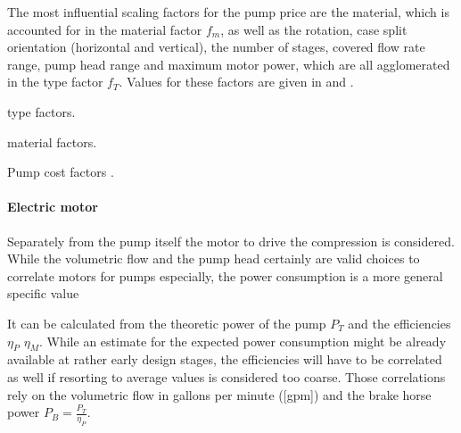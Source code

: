 			The most influential scaling factors for the pump price are the material, which is accounted
			for in the material factor $f_m$, as well as the rotation, case split orientation (horizontal
			and vertical), the number of stages, covered flow rate range, pump head range and maximum
			motor power, which are all agglomerated in the type factor $f_T$. Values for these factors
			are given in  and .
			
            \begin{table}
                \center
                \begin{subtable}{.68\linewidth}
                    \footnotesize
                    \center
                    
                    \caption{type factors.}
                    \label{tab:pump:Type}
                \end{subtable}
                \begin{subtable}{.3\linewidth}
                    \footnotesize
                    \center
                    
                    \caption{material factors.}
                    \label{tab:pump:Material}
                \end{subtable}
                \caption{Pump cost factors \cite{Seider.2010}.}
            \end{table}
			
		\paragraph{Electric motor}
			Separately from the pump itself the motor to drive the compression is considered. While the
			volumetric flow and the pump head certainly are valid choices to correlate motors for pumps
			especially, the power consumption is a more general specific value
			
			It can be calculated from the theoretic power of the pump $P_T$ and the efficiencies $\eta_P$
			$\eta_M$. While an estimate for the expected power consumption might be already available at
			rather early design stages, the efficiencies will have to be correlated as well if resorting
			to average values is considered too coarse. Those correlations rely on the volumetric flow in
			gallons per minute ([gpm]) and the brake horse power $P_B = \frac{P_T}{\eta_P}$.
			
			
